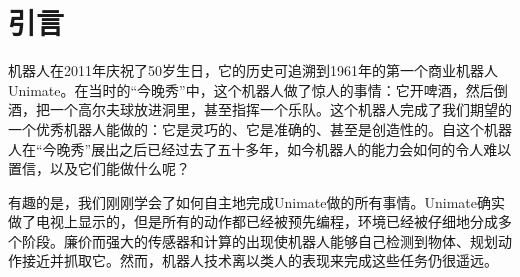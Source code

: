 \chapter{引言}\label{chap:introduction}

机器人在2011年庆祝了50岁生日，它的历史可追溯到1961年的第一个商业机器人Unimate。在当时的“今晚秀”中，这个机器人做了惊人的事情：它开啤酒，然后倒酒，把一个高尔夫球放进洞里，甚至指挥一个乐队。这个机器人完成了我们期望的一个优秀机器人能做的：它是灵巧的、它是准确的、甚至是创造性的。自这个机器人在“今晚秀”展出之后已经过去了五十多年，如今机器人的能力会如何的令人难以置信，以及它们能做什么呢？


有趣的是，我们刚刚学会了如何自主地完成Unimate做的所有事情。Unimate确实做了电视上显示的，但是所有的动作都已经被预先编程，环境已经被仔细地分成多个阶段。廉价而强大的传感器和计算的出现使机器人能够自己检测到物体、规划动作接近并抓取它。然而，机器人技术离以类人的表现来完成这些任务仍很遥远。



